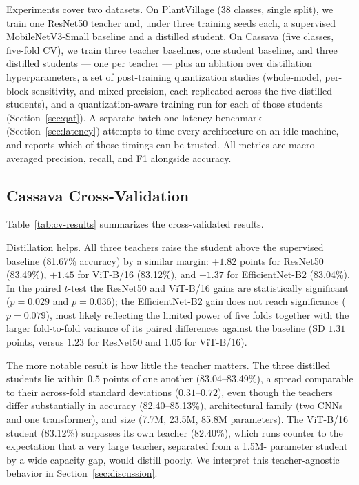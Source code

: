 \documentclass[conference]{IEEEtran}
\begin{document}
Experiments cover two datasets. On PlantVillage (38 classes, single split), we
train one ResNet50 teacher and, under three training seeds each, a supervised
MobileNetV3-Small baseline and a distilled student. On Cassava (five classes,
five-fold CV), we train three
teacher baselines, one student baseline, and three distilled students --- one
per teacher --- plus an ablation over distillation hyperparameters, a set of
post-training quantization studies (whole-model, per-block sensitivity, and
mixed-precision, each replicated across the five distilled students), and a
quantization-aware training run for each of those students
(Section~\ref{sec:qat}). A separate batch-one latency benchmark
(Section~\ref{sec:latency}) attempts to time every architecture on an idle
machine, and reports which of those timings can be trusted. All metrics are
macro-averaged precision, recall, and F1 alongside accuracy.

\subsection{Cassava Cross-Validation}
\label{sec:cv-results}

Table~\ref{tab:cv-results} summarizes the cross-validated results.



Distillation helps. All three teachers raise the student above the supervised
baseline (81.67\% accuracy) by a similar margin: $+1.82$ points for ResNet50
(83.49\%), $+1.45$ for ViT-B/16 (83.12\%), and $+1.37$ for EfficientNet-B2
(83.04\%). In the paired $t$-test the ResNet50 and ViT-B/16 gains are
statistically significant ($p=0.029$ and $p=0.036$); the EfficientNet-B2 gain
does not reach significance ($p=0.079$), most likely reflecting the limited
power of five folds together with the larger fold-to-fold variance of its
paired differences against the baseline (SD $1.31$ points, versus $1.23$ for
ResNet50 and $1.05$ for ViT-B/16).

The more notable result is how little the teacher matters. The three distilled
students lie within $0.5$ points of one another (83.04--83.49\%), a spread
comparable to their across-fold standard deviations ($0.31$--$0.72$), even
though the teachers
differ substantially in accuracy (82.40--85.13\%), architectural family (two
CNNs and one transformer), and size (7.7M, 23.5M, 85.8M parameters). The
ViT-B/16 student (83.12\%) surpasses its own teacher (82.40\%), which runs
counter to the expectation that a very large teacher, separated from a 1.5M-
parameter student by a wide capacity gap, would distill poorly. We interpret this teacher-agnostic behavior in
Section~\ref{sec:discussion}.
\end{document}
